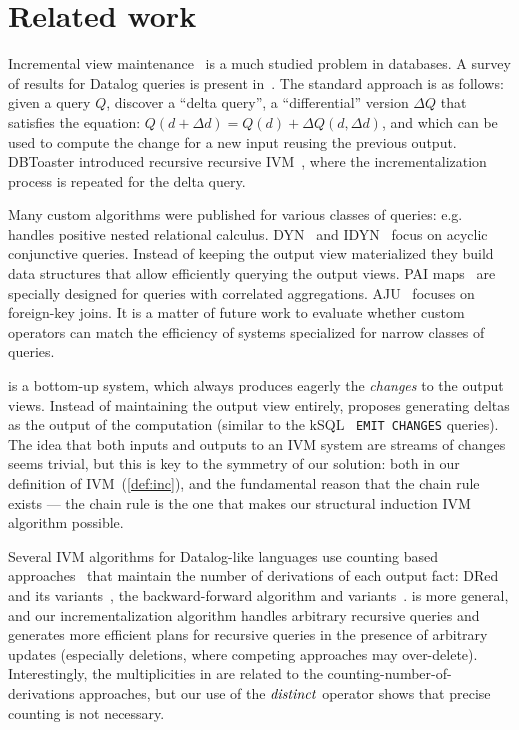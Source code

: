 \section{Related work}\label{sec:related}

Incremental view maintenance~\cite{gupta-sigmod93, griffin-sigmod95, chaudhuri-icde95, 
gupta-idb95, chirkova-book12} is a much studied problem in databases.
A survey of results for Datalog queries is present in~\cite{motik-ai19}. 
The standard approach is as follows: given a query $Q$, discover a ``delta query'', 
a ``differential'' version $\Delta Q$ that satisfies the equation:
$Q(d+\Delta d)=Q(d)+\Delta Q(d,\Delta d)$, and which can be used to compute 
the change for a new input reusing the previous output. 
DBToaster introduced recursive recursive IVM~\cite{ahmad-vldb09, koch-pods10}, where
the incrementalization process is repeated for the delta query.

Many custom algorithms were published for various classes of queries: e.g.~\cite{koch-pods16}
handles positive nested relational calculus.  DYN~\cite{idris-sigmod17}
and IDYN~\cite{idris-vldb18, idris-sigmod19} focus on acyclic conjunctive queries.  Instead
of keeping the output view materialized they build data structures that allow efficiently 
querying the output views.  PAI maps~\cite{abeysinghe-sigmod22} are specially
designed for queries with correlated aggregations.  
AJU~\cite{wang-sigmod20} focuses on foreign-key joins.  It is a matter
of future work to evaluate whether custom \dbsp operators 
can match the efficiency of systems specialized for narrow classes 
of queries.  

\dbsp is a bottom-up system, which always produces eagerly 
the \emph{changes} to the output views.  
Instead of maintaining the output view entirely, \dbsp proposes
generating deltas as the output of the computation (similar to the kSQL~\cite{jafarpour-edbt19}
\texttt{EMIT CHANGES} queries).  The idea that both
inputs and outputs to an IVM system are streams of changes 
seems trivial, but this is key to the symmetry of our solution:
both in our definition of IVM~(\ref{def:inc}), and the fundamental
reason that the chain rule exists --- the chain rule is the one that makes our
structural induction IVM algorithm possible.

Several IVM algorithms for Datalog-like languages use counting based 
approaches~\cite{Dewan-iis92,motik-aaai15} that maintain the number of derivations of each
output fact: DRed~\cite{gupta-sigmod93} and its variants~\cite{Ceri-VLDB91,Wolfson-sigmod91,
Staudt-vldb96,Kotowski-rr11,Lu-sigmod95,Apt-sigmod87}, the backward-forward algorithm 
and variants~\cite{motik-aaai15,Harrison-wdd92,motik-ai19}.  
\dbsp is more general, 
and our incrementalization algorithm handles arbitrary recursive queries and 
generates more efficient plans for recursive queries
in the presence of arbitrary updates (especially deletions, where competing approaches
may over-delete).  Interestingly, the \zrs multiplicities in \dbsp are related 
to the counting-number-of-derivations approaches, but our use of the $\mathit{distinct}$
operator shows that precise counting is not necessary.

